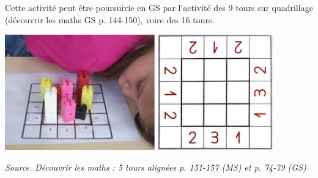 \begin{exercice*}
Cette activité peut être poursuivie en GS par l'activité des 9 tours sur quadrillage (découvrir les maths GS p. 144-150), voire des 16 tours.
   \begin{center}
      \includegraphics[height=5cm]{Geometrie_did/Images/Geo6_analyse_quadrillage1} \qquad  \includegraphics[height=5cm]{Geometrie_did/Images/Geo6_analyse_quadrillage2}
   \end{center}

   \vfill\hfill{\it\small Source. Découvrir les maths : 5 tours alignées p. 151-157 (MS) et p. 74-79 (GS)}
\end{exercice*}

\pagebreak


